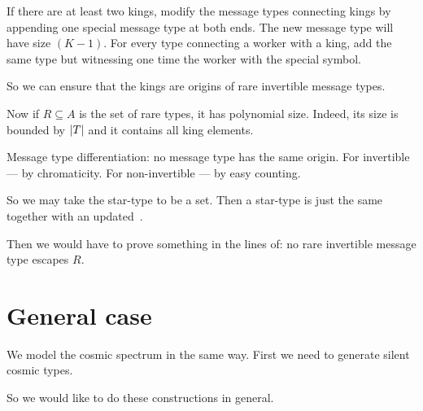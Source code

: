 If there are at least two kings, modify the message types connecting kings by
appending one special message type at both ends.
The new message type will have size $(K-1)$.
For every type connecting a worker with a king, add the same type but witnessing
one time the worker with the special symbol.

So we can ensure that the kings are origins of rare invertible message types.

Now if $R \subseteq A$ is the set of rare types, it has polynomial size.
Indeed, its size is bounded by $\left|T\right|$ and it contains all king elements.

Message type differentiation: no message type has the same origin.
For invertible --- by chromaticity.
For non-invertible --- by easy counting.

So we may take the star-type to be a set.
Then a star-type is just the same together with an updated~.

Then we would have to prove something in the lines of: no rare invertible
message type escapes $R$.

\section{General case}
We model the cosmic spectrum in the same way.
First we need to generate silent cosmic types.

So we would like to do these constructions in general.
